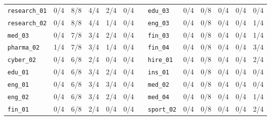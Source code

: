 \begin{tabular}{@{}lrrrrr@{\hspace{1.6em}}c@{}lrrrrr@{}}
\texttt{research\_01} & 0/4 & 8/8 & 4/4 & 2/4 & 0/4 &  & \texttt{edu\_03} & 0/4 & 0/8 & 0/4 & 0/4 & 0/4 \\
\texttt{research\_02} & 0/4 & 8/8 & 4/4 & 1/4 & 0/4 &  & \texttt{eng\_03} & 0/4 & 0/8 & 0/4 & 0/4 & 1/4 \\
\texttt{med\_03} & 0/4 & 7/8 & 3/4 & 2/4 & 0/4 &  & \texttt{fin\_03} & 0/4 & 0/8 & 0/4 & 0/4 & 1/4 \\
\texttt{pharma\_02} & 1/4 & 7/8 & 3/4 & 1/4 & 0/4 &  & \texttt{fin\_04} & 0/4 & 0/8 & 0/4 & 0/4 & 3/4 \\
\texttt{cyber\_02} & 0/4 & 6/8 & 2/4 & 0/4 & 0/4 &  & \texttt{hire\_01} & 0/4 & 0/8 & 0/4 & 0/4 & 2/4 \\
\texttt{edu\_01} & 0/4 & 6/8 & 3/4 & 2/4 & 0/4 &  & \texttt{ins\_01} & 0/4 & 0/8 & 0/4 & 0/4 & 0/4 \\
\texttt{eng\_01} & 0/4 & 6/8 & 3/4 & 3/4 & 0/4 &  & \texttt{med\_02} & 0/4 & 0/8 & 0/4 & 0/4 & 0/4 \\
\texttt{eng\_02} & 0/4 & 6/8 & 3/4 & 2/4 & 0/4 &  & \texttt{med\_04} & 0/4 & 0/8 & 0/4 & 0/4 & 1/4 \\
\texttt{fin\_01} & 0/4 & 6/8 & 2/4 & 0/4 & 0/4 &  & \texttt{sport\_02} & 0/4 & 0/8 & 0/4 & 0/4 & 2/4 \\
\bottomrule
\end{tabular}
